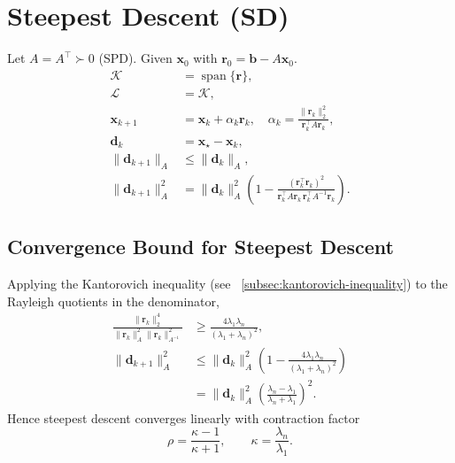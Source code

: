 \section{Steepest Descent (SD)}
Let $A = A^{\top} \succ 0$ (SPD).
Given $\mathbf{x}_0$ with $\mathbf{r}_0 = \mathbf{b} - A\mathbf{x}_0$.
\begin{align*}
  \mathcal{K}              & = \operatorname{span}\{\mathbf{r}\},                                                                                                                              \\
  \mathcal{L}              & = \mathcal{K},                                                                                                                                                    \\
  \mathbf{x}_{k+1}         & = \mathbf{x}_k + \alpha_k \mathbf{r}_k,
  \quad \alpha_k = \frac{\|\mathbf{r}_k\|_2^2}{\mathbf{r}_k^{\top} A \mathbf{r}_k},                                                                                                            \\
  \mathbf{d}_k             & = \mathbf{x}_{\star} - \mathbf{x}_k,                                                                                                                              \\
  \|\mathbf{d}_{k+1}\|_A   & \leq \|\mathbf{d}_k\|_A,                                                                                                                                          \\
  \|\mathbf{d}_{k+1}\|_A^2 & = \|\mathbf{d}_k\|_A^2\left(1 - \frac{(\mathbf{r}_k^{\top} \mathbf{r}_k)^2}{\mathbf{r}_k^{\top} A \mathbf{r}_k \,\mathbf{r}_k^{\top} A^{-1} \mathbf{r}_k}\right).
\end{align*}

\subsection{Convergence Bound for Steepest Descent}
Applying the Kantorovich inequality (see ~\autoref{subsec:kantorovich-inequality}) to the Rayleigh quotients in the denominator,
\begin{align*}
  \frac{\|\mathbf{r}_k\|_2^4}{\|\mathbf{r}_k\|_A^2 \|\mathbf{r}_k\|_{A^{-1}}^2}
   & \geq \frac{4 \lambda_1 \lambda_n}{(\lambda_1 + \lambda_n)^2},                                     \\
  \|\mathbf{d}_{k+1}\|_A^2
   & \leq \|\mathbf{d}_k\|_A^2\left(1 - \frac{4 \lambda_1 \lambda_n}{(\lambda_1 + \lambda_n)^2}\right) \\
   & = \|\mathbf{d}_k\|_A^2\left(\frac{\lambda_n - \lambda_1}{\lambda_n + \lambda_1}\right)^2.
\end{align*}
Hence steepest descent converges linearly with contraction factor
\[
  \rho = \frac{\kappa - 1}{\kappa + 1}, \qquad \kappa = \frac{\lambda_n}{\lambda_1}.
\]


